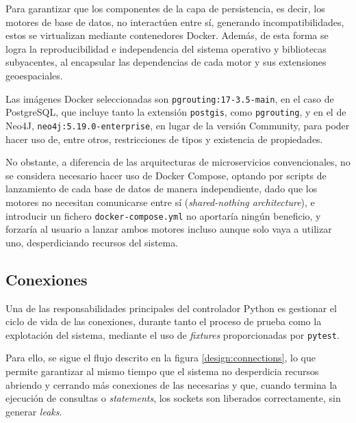 Para garantizar que los componentes de la capa de persistencia, es decir, los motores de base de datos, no interactúen entre sí, generando incompatibilidades, estos se virtualizan mediante contenedores Docker\cite{docker}. Además, de esta forma se logra la reproducibilidad e independencia del sistema operativo y bibliotecas subyacentes, al encapsular las dependencias de cada motor y sus extensiones geoespaciales.

Las imágenes Docker seleccionadas son \texttt{pgrouting:17-3.5-main}, en el caso de PostgreSQL, que incluye tanto la extensión \texttt{postgis}, como \texttt{pgrouting}, y en el de Neo4J, \texttt{neo4j:5.19.0-enterprise}, en lugar de la versión Community, para poder hacer uso de, entre otros, restricciones de tipos y existencia de propiedades.

No obstante, a diferencia de las arquitecturas de microservicios convencionales, no se considera necesario hacer uso de Docker Compose, optando por scripts de lanzamiento de cada base de datos de manera independiente, dado que los motores no necesitan comunicarse entre sí (\textit{shared-nothing architecture}), e introducir un fichero \texttt{docker-compose.yml} no aportaría ningún beneficio, y forzaría al usuario a lanzar ambos motores incluso aunque solo vaya a utilizar uno, desperdiciando recursos del sistema.

\subsection{Conexiones}

Una de las responsabilidades principales del controlador Python\cite{python} es gestionar el ciclo de vida de las conexiones, durante tanto el proceso de prueba como la explotación del sistema, mediante el uso de \textit{fixtures} proporcionadas por \texttt{pytest}.

Para ello, se sigue el flujo descrito en la figura \ref{design:connections}, lo que permite garantizar al mismo tiempo que el sistema no desperdicia recursos abriendo y cerrando más conexiones de las necesarias y que, cuando termina la ejecución de consultas o \textit{statements}, los sockets son liberados correctamente, sin generar \textit{leaks}.

